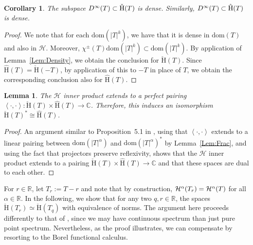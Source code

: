 \documentclass[a4paper,10pt,reqno]{amsart}
\newcommand{\R}{\mathbb{R}}
\newcommand{\C}{\mathbb{C}}
\newcommand{\modulus}[1]{|#1|}
\newcommand{\Dk}[2][{}]{{\rm D}^{#2}_{\rm #1}}%
\newcommand{\OpSobH}[2][{}]{{\mathcal{H}}^{#2}_{\rm #1}}
\newcommand{\checkH}{\check{\mathrm{H}}}
\newcommand{\hatH}{\hat{\mathrm{H}}}
\newcommand{\Hil}{\mathscr{H}}
\newcommand{\dom}{\mathrm{dom}}
\newcommand{\inprod}[1]{\left\langle #1 \right\rangle}%
\newtheorem{lemma}[theorem]{Lemma}
\newtheorem{corollary}[theorem]{Corollary}
\theoremstyle{definition}
\begin{document}
\begin{corollary}
\label{Cor:Dinf}
The subspace $\Dk{\infty}(T) \subset \checkH(T)$ is dense.
Similarly,  $\Dk{\infty}(T) \subset \hatH(T)$ is dense.
\end{corollary}
\begin{proof}
We note that for each $\dom(\modulus{T}^k)$, we have that it is dense in $\dom(T)$ and also in $\Hil$.
Moreover, $\chi^{\pm}(T) \dom(\modulus{T}^k) \subset \dom(\modulus{T}^k)$.
By application of Lemma~\ref{Lem:Density}, we obtain the conclusion for $\checkH(T)$.
Since $\hatH(T) = \checkH(-T)$, by application of this to $-T$ in place of $T$, we obtain the corresponding conclusion also for $\hatH(T)$.
\end{proof}


\begin{lemma}
\label{Lem:Duality}
The $\Hil$ inner product extends to a perfect pairing $\inprod{\cdot,\cdot}: \checkH(T) \times \hatH(T) \to \C$.
Therefore, this induces an isomorphism $\checkH(T)^\ast \cong \hatH(T)$.
\end{lemma}
\begin{proof}
An argument similar to Proposition~5.1 in \cite{BBan}, using that $\inprod{\cdot,\cdot}$ extends to a linear pairing between $\dom(\modulus{T}^\alpha)$ and $\dom(\modulus{T}^\alpha)^\ast$ by Lemma~\ref{Lem:Frac}, and using the fact that projectors preserve reflexivity,   shows that the $\Hil$ inner product extends to a pairing $\checkH(T) \times \hatH(T) \to \C$ and that these spaces are dual to each other.
\end{proof}

For $r \in \R$, let $T_r := T - r$ and note that by construction, $\OpSobH{\alpha}(T_r) = \OpSobH{\alpha}(T)$  for all $\alpha \in \R$.
In the following, we show that for any two $q, r \in \R$, the spaces $\checkH(T_r) \simeq \checkH(T_q)$ with equivalence of norms.
The argument here proceeds differently to that of \cite{BBan}, since we may have continuous spectrum than just pure point spectrum.
Nevertheless, as the proof illustrates, we can compensate by resorting to the Borel functional calculus.
\end{document}
